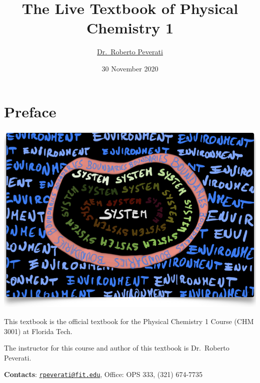 \documentclass[
  9pt,
]{extbook}
\title{The Live Textbook of Physical Chemistry 1}
\author{\href{mailto:rpeverati@fit.edu}{Dr.~Roberto Peverati}}
\date{30 November 2020}
\let\oldmaketitle\maketitle
\theoremstyle{definition}
\theoremstyle{definition}
\theoremstyle{definition}
\theoremstyle{remark}
\begin{document}
\maketitle


%
\newpage

\let\maketitle\oldmaketitle

\renewcommand\thepage{\romannumeral\numexpr\value{page}-1\relax}


{
\setcounter{tocdepth}{1}
\tableofcontents
}
\renewcommand{\arraystretch}{1.8}

\hypertarget{preface}{%
\chapter*{Preface}\label{preface}}

\begin{center}\includegraphics[width=0.8\linewidth]{./img/OEP_Figures.000} \end{center}

This textbook is the official textbook for the Physical Chemistry 1 Course (CHM 3001) at Florida Tech.

The instructor for this course and author of this textbook is Dr.~Roberto Peverati.

\textbf{Contacts}: \href{mailto:rpeverati@fit.edu}{\nolinkurl{rpeverati@fit.edu}}, Office: OPS 333, (321) 674-7735
\end{document}

